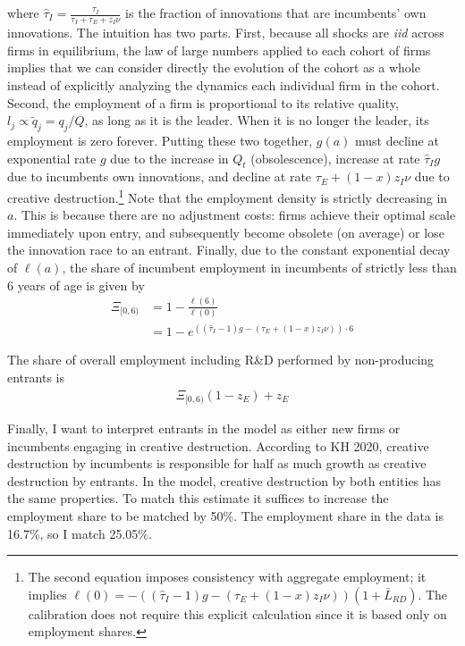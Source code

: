\documentclass[12pt,english]{article}
\theoremstyle{remark}
\begin{document}
where $\hat{\tau}_I = \frac{\tau_I}{\tau_I + \tau_E + z_I \nu}$ is the fraction of innovations that are incumbents' own innovations. The intuition has two parts. First, because all shocks are \textit{iid} across firms in equilibrium, the law of large numbers applied to each cohort of firms implies that we can consider directly the evolution of the cohort as a whole instead of explicitly analyzing the dynamics each individual firm in the cohort.  Second, the employment of a firm is proportional to its relative quality, $l_j \propto \tilde{q}_j = q_j / Q$, as long as it is the leader. When it is no longer the leader, its employment is zero forever. Putting these two together, $g(a)$ must decline at exponential rate $g$ due to the increase in $Q_t$ (obsolescence), increase at rate $\hat{\tau}_I g$ due to incumbents own innovations, and decline at rate $\tau_E + (1-x)z_I \nu$ due to creative destruction.\footnote{The second equation imposes consistency with aggregate employment; it implies $\ell(0) = -((\hat{\tau}_I -1)g - (\tau_E + (1-x)z_I \nu))(1 + \bar{L}_{RD})$. The calibration does not require this explicit calculation since it is based only on employment shares.} Note that the employment density is strictly decreasing in $a$. This is because there are no adjustment costs: firms achieve their optimal scale immediately upon entry, and subsequently become obsolete (on average) or lose the innovation race to an entrant. Finally, due to the constant exponential decay of $\ell(a)$, the share of incumbent employment in incumbents of strictly less than 6 years of age is given by 
\begin{align*}
	\Xi_{[0,6)} &=  1 - \frac{\ell(6)}{\ell(0)} \\
	    &= 1 - e^{((\hat{\tau}_I -1)g - (\tau_E + (1-x)z_I \nu))\cdot 6}
\end{align*}  


The share of overall employment including R\&D performed by non-producing entrants is 
\begin{align*}
	\Xi_{[0,6)} ( 1 - z_E ) + z_E
\end{align*}

Finally, I want to interpret entrants in the model as either new firms or incumbents engaging in creative destruction. According to KH 2020, creative destruction by incumbents is responsible for half as much growth as creative destruction by entrants. In the model, creative destruction by both entities has the same properties. To match this estimate it suffices to increase the employment share to be matched by 50\%. The employment share in the data is 16.7\%, so I match 25.05\%. 
\end{document}
